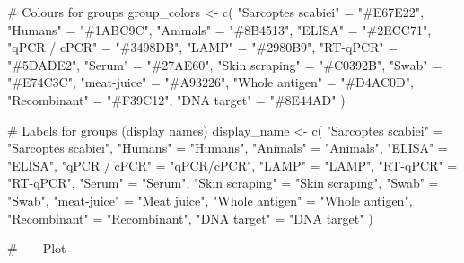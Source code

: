 \documentclass[
  letterpaper,
  DIV=11,
  numbers=noendperiod]{scrartcl}
\newenvironment{Shaded}{\begin{snugshade}}{\end{snugshade}}
\newcommand{\CommentTok}[1]{\textcolor[rgb]{0.37,0.37,0.37}{#1}}
\newcommand{\FunctionTok}[1]{\textcolor[rgb]{0.28,0.35,0.67}{#1}}
\newcommand{\NormalTok}[1]{\textcolor[rgb]{0.00,0.23,0.31}{#1}}
\newcommand{\OtherTok}[1]{\textcolor[rgb]{0.00,0.23,0.31}{#1}}
\newcommand{\StringTok}[1]{\textcolor[rgb]{0.13,0.47,0.30}{#1}}
\begin{document}
\begin{Shaded}
\begin{Highlighting}[]
\CommentTok{\# Colours for groups}
\NormalTok{group\_colors }\OtherTok{\textless{}{-}} \FunctionTok{c}\NormalTok{(}
  \StringTok{"Sarcoptes scabiei"} \OtherTok{=} \StringTok{"\#E67E22"}\NormalTok{,}
  \StringTok{"Humans"} \OtherTok{=} \StringTok{"\#1ABC9C"}\NormalTok{,}
  \StringTok{"Animals"} \OtherTok{=} \StringTok{"\#8B4513"}\NormalTok{,}
  \StringTok{"ELISA"} \OtherTok{=} \StringTok{"\#2ECC71"}\NormalTok{,}
  \StringTok{"qPCR / cPCR"} \OtherTok{=} \StringTok{"\#3498DB"}\NormalTok{,}
  \StringTok{"LAMP"} \OtherTok{=} \StringTok{"\#2980B9"}\NormalTok{,}
  \StringTok{"RT{-}qPCR"} \OtherTok{=} \StringTok{"\#5DADE2"}\NormalTok{,}
  \StringTok{"Serum"} \OtherTok{=} \StringTok{"\#27AE60"}\NormalTok{,}
  \StringTok{"Skin scraping"} \OtherTok{=} \StringTok{"\#C0392B"}\NormalTok{,}
  \StringTok{"Swab"} \OtherTok{=} \StringTok{"\#E74C3C"}\NormalTok{,}
  \StringTok{"meat{-}juice"} \OtherTok{=} \StringTok{"\#A93226"}\NormalTok{,}
  \StringTok{"Whole antigen"} \OtherTok{=} \StringTok{"\#D4AC0D"}\NormalTok{,}
  \StringTok{"Recombinant"} \OtherTok{=} \StringTok{"\#F39C12"}\NormalTok{,}
  \StringTok{"DNA target"} \OtherTok{=} \StringTok{"\#8E44AD"}
\NormalTok{)}

\CommentTok{\# Labels for groups (display names)}
\NormalTok{display\_name }\OtherTok{\textless{}{-}} \FunctionTok{c}\NormalTok{(}
  \StringTok{"Sarcoptes scabiei"} \OtherTok{=} \StringTok{"Sarcoptes scabiei"}\NormalTok{,}
  \StringTok{"Humans"} \OtherTok{=} \StringTok{"Humans"}\NormalTok{,}
  \StringTok{"Animals"} \OtherTok{=} \StringTok{"Animals"}\NormalTok{,}
  \StringTok{"ELISA"} \OtherTok{=} \StringTok{"ELISA"}\NormalTok{,}
  \StringTok{"qPCR / cPCR"} \OtherTok{=} \StringTok{"qPCR/cPCR"}\NormalTok{,}
  \StringTok{"LAMP"} \OtherTok{=} \StringTok{"LAMP"}\NormalTok{,}
  \StringTok{"RT{-}qPCR"} \OtherTok{=} \StringTok{"RT{-}qPCR"}\NormalTok{,}
  \StringTok{"Serum"} \OtherTok{=} \StringTok{"Serum"}\NormalTok{,}
  \StringTok{"Skin scraping"} \OtherTok{=} \StringTok{"Skin scraping"}\NormalTok{,}
  \StringTok{"Swab"} \OtherTok{=} \StringTok{"Swab"}\NormalTok{,}
  \StringTok{"meat{-}juice"} \OtherTok{=} \StringTok{"Meat juice"}\NormalTok{,}
  \StringTok{"Whole antigen"} \OtherTok{=} \StringTok{"Whole antigen"}\NormalTok{,}
  \StringTok{"Recombinant"} \OtherTok{=} \StringTok{"Recombinant"}\NormalTok{,}
  \StringTok{"DNA target"} \OtherTok{=} \StringTok{"DNA target"}
\NormalTok{)}

\CommentTok{\# {-}{-}{-}{-} Plot {-}{-}{-}{-}}


\end{Highlighting}
\end{Shaded}
\end{document}
